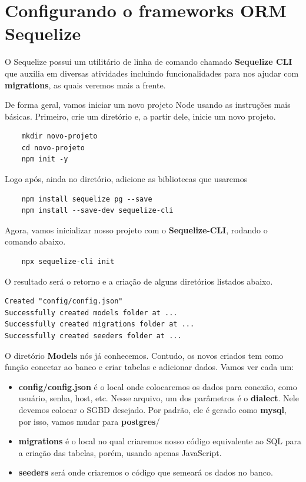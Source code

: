 \section{Configurando o frameworks ORM Sequelize}

O Sequelize possui um utilitário de linha de comando chamado \textbf{Sequelize CLI} que auxilia em diversas atividades incluindo funcionalidades para nos ajudar com \textbf{migrations}, as quais veremos mais a frente. 

De forma geral, vamos iniciar um novo projeto Node usando as instruções mais básicas. Primeiro, crie um diretório e, a partir dele, inicie um novo projeto.

\begin{verbatim}
	mkdir novo-projeto
	cd novo-projeto
	npm init -y
\end{verbatim}

Logo após, ainda no diretório, adicione as bibliotecas que usaremos

\begin{verbatim}
	npm install sequelize pg --save
	npm install --save-dev sequelize-cli
\end{verbatim}

Agora, vamos inicializar nosso projeto com o \textbf{Sequelize-CLI}, rodando o comando abaixo.

\begin{verbatim}
	npx sequelize-cli init
\end{verbatim}

O resultado será o retorno e a criação de alguns diretórios listados abaixo.

\begin{verbatim}
Created "config/config.json"
Successfully created models folder at ...
Successfully created migrations folder at ...
Successfully created seeders folder at ...
\end{verbatim}

O diretório \textbf{Models} nós já conhecemos. Contudo, os novos criados tem como função conectar ao banco e criar tabelas e adicionar dados. Vamos ver cada um:

\begin{itemize}
	\item \textbf{config/config.json} é o local onde colocaremos os dados para conexão, como usuário, senha, host, etc. Nesse arquivo, um dos parâmetros é o \textbf{dialect}. Nele devemos colocar o SGBD desejado. Por padrão, ele é gerado como \textbf{mysql}, por isso, vamos mudar para \textbf{postgres}/
	\item \textbf{migrations} é o local no qual criaremos nosso código equivalente ao SQL para a criação das tabelas, porém, usando apenas JavaScript.
	\item \textbf{seeders} será onde criaremos o código que semeará os dados no banco.
\end{itemize} 

